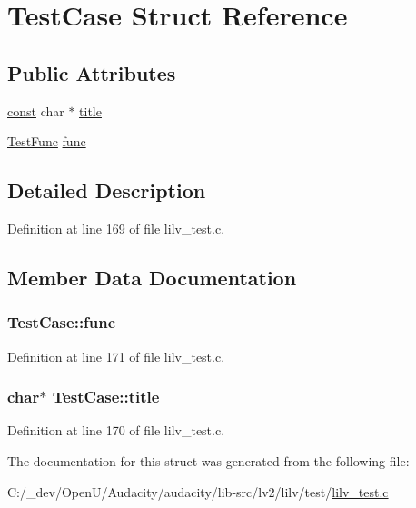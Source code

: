 \hypertarget{struct_test_case}{}\section{Test\+Case Struct Reference}
\label{struct_test_case}
\subsection*{Public Attributes}
\begin{DoxyCompactItemize}
\item 
\hyperlink{getopt1_8c_a2c212835823e3c54a8ab6d95c652660e}{const} char $\ast$ \hyperlink{struct_test_case_abb2093bcd9ec83c2d0ca55eaa01abb3e}{title}
\item 
\hyperlink{lilv__test_8c_addc97aa5030c040d9dfe8657a2dab073}{Test\+Func} \hyperlink{struct_test_case_af49ed9b921e2030263ed93f02809139f}{func}
\end{DoxyCompactItemize}


\subsection{Detailed Description}


Definition at line 169 of file lilv\+\_\+test.\+c.



\subsection{Member Data Documentation}
\subsubsection[{\texorpdfstring{func}{func}}]{ Test\+Case\+::func}\hypertarget{struct_test_case_af49ed9b921e2030263ed93f02809139f}{}\label{struct_test_case_af49ed9b921e2030263ed93f02809139f}


Definition at line 171 of file lilv\+\_\+test.\+c.

\subsubsection[{\texorpdfstring{title}{title}}]{ char$\ast$ Test\+Case\+::title}\hypertarget{struct_test_case_abb2093bcd9ec83c2d0ca55eaa01abb3e}{}\label{struct_test_case_abb2093bcd9ec83c2d0ca55eaa01abb3e}


Definition at line 170 of file lilv\+\_\+test.\+c.



The documentation for this struct was generated from the following file\+:\begin{DoxyCompactItemize}
\item 
C\+:/\+\_\+dev/\+Open\+U/\+Audacity/audacity/lib-\/src/lv2/lilv/test/\hyperlink{lilv__test_8c}{lilv\+\_\+test.\+c}\end{DoxyCompactItemize}
